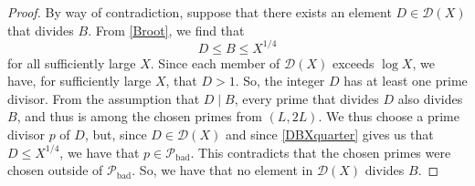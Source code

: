 \documentclass[12pt]{article}
\begin{document}
\begin{proof}
 By way of contradiction, suppose that there exists
 an element $D \in \mathcal{D}(X)$ that divides $B$. From \eqref{Broot}, we find that 
\begin{equation}\label{DBXquarter} 
 D \leq B \leq X^{1/4} 
\end{equation}
 for all sufficiently large $X$. Since each member of $\mathcal{D}(X)$ exceeds $\log X$, 
 we have, for sufficiently large $X$, that $D > 1$. 
 So, the integer $D$ has at least one prime divisor. From the assumption that $D \mid B$, 
 every prime that divides $D$ also divides $B$, and thus is among the chosen primes from $(L, 2L)$. 
 We thus choose a prime divisor $p$ of $D$, but, since $D \in \mathcal{D}(X)$
 and since \eqref{DBXquarter} gives us that $D \leq X^{1/4}$, 
 we have that $p \in \mathcal{P}_{\operatorname{bad}}$. 
 This contradicts that the chosen primes were chosen outside of $\mathcal{P}_{\operatorname{bad}}$.
 So, we have that no element in $\mathcal{D}(X)$ divides $B$. 


\end{proof}
\end{document}
